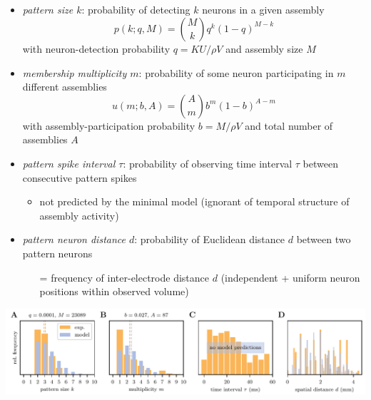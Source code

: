 \documentclass[8pt,t,usepdftitle=false]{beamer}
\begin{document}
\subsection{\ttl}
\begin{frame}[plain]
  \frametitle{\ttl}
  \begin{itemize}
  \item<1-> \emph{pattern size $k$}: probability of detecting $k$ neurons in a given assembly
    \begin{equation*}
      p(k;q,M) = \binom{M}{k}  q^k (1-q)^{M-k}
    \end{equation*}
    with neuron-detection probability $q=KU/\rho{}V$ and assembly size $M$
  \item<2-> \emph{membership multiplicity $m$}: probability of some neuron participating in $m$ different assemblies
    \begin{equation*}
      u(m;b,A)=\binom{A}{m} b^m (1-b)^{A-m}
    \end{equation*}
    with assembly-participation probability $b=M/\rho{}V$ and total number of assemblies $A$ 
  \item<3-> \emph{pattern spike interval $\tau$}: probability of observing time interval $\tau$ between consecutive pattern spikes\\
    \begin{itemize}
    \item not predicted by the minimal model {\footnotesize (ignorant of temporal structure of assembly activity)}
    \end{itemize}
  \item<4-> \emph{pattern neuron distance $d$}: probability of Euclidean distance $d$ between two pattern neurons\\
    \begin{itemize}
    \item[=] frequency of inter-electrode distance $d$
      {\footnotesize (independent + uniform neuron positions within observed volume)}
    \end{itemize}
  \end{itemize}
  \parbox{\linewidth}{ \includegraphics[width=\linewidth]{./figures/minimal_model_stats_rho_35000.pdf}
  }
\end{frame}
\def\ttl{Fitting procedure and results}
\end{document}
